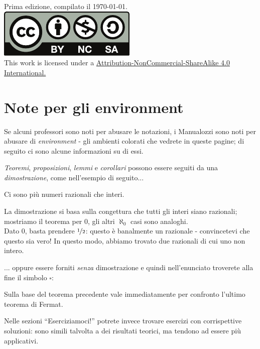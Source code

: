 \vfill
\begin{center}
	Prima edizione, compilato il \today.\\
			\includegraphics[trim=0cm 0cm 0cm 0cm,clip,scale=0.5]{images/Cc-by-nc-sa_icon.pdf}\\
	{\footnotesize This work is licensed under a \href{https://creativecommons.org/licenses/by-sa/4.0/}{Attribution-NonCommercial-ShareAlike 4.0 International.}}
\end{center}
\newpage
\section*{Note per gli environment}
Se alcuni professori sono noti per abusare le notazioni, i Manualozzi sono noti per abusare di \textit{environment} - gli ambienti colorati che vedrete in queste pagine; di seguito ci sono alcune informazioni su di essi.

\noindent\textit{Teoremi}, \textit{proposizioni}, \textit{lemmi} e \textit{corollari} possono essere seguiti da una \textit{dimostrazione}, come nell'esempio di seguito...
\begin{theoremanote}
	Ci sono più numeri razionali che interi.
\end{theoremanote}
\begin{demonstration}
	La dimostrazione si basa sulla congettura che tutti gli interi siano razionali; mostriamo il teorema per $0$, gli altri $\aleph_0$ casi sono analoghi.\\
	Dato $0$, basta prendere $\nicefrac{1}{2}$: questo è banalmente un razionale - convincetevi che questo sia vero! In questo modo, abbiamo trovato due razionali di cui uno non intero.
\end{demonstration}
... oppure essere forniti \textit{senza} dimostrazione e quindi nell'enunciato troverete alla fine il simbolo $\square$:
\begin{corollarynote}
	Sulla base del teorema precedente vale immediatamente per confronto l'ultimo teorema di Fermat.
\end{corollarynote}
Nelle sezioni ``Eserciziamoci!'' potrete invece trovare esercizi con corrispettive soluzioni: sono simili talvolta a dei risultati teorici, ma tendono ad essere più applicativi.

